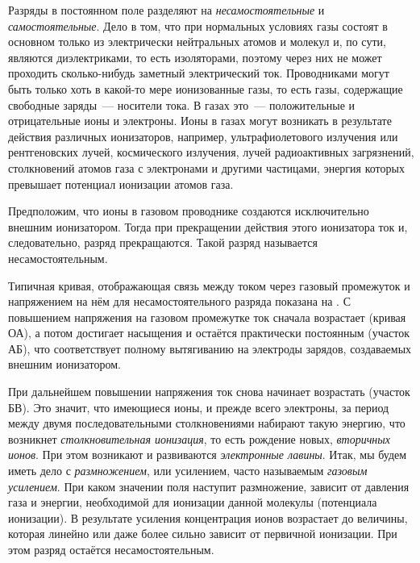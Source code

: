 Разряды в постоянном поле разделяют на \textit{несамостоятельные} и \textit{самостоятельные}. Дело в том, что при нормальных
условиях газы состоят в основном только из электрически нейтральных атомов и молекул и, по сути, являются диэлектриками,
то есть изоляторами, поэтому через них не может проходить сколько-нибудь заметный электрический ток. Проводниками могут
быть только хоть в какой-то мере ионизованные газы, то есть газы, содержащие свободные заряды~--- носители тока. В газах
это~--- положительные и отрицательные ионы и электроны. Ионы в газах могут возникать в результате действия различных
ионизаторов, например, ультрафиолетового излучения или рентгеновских лучей, космического излучения, лучей радиоактивных
загрязнений, столкновений атомов газа с электронами и другими частицами, энергия которых превышает потенциал ионизации
атомов газа.

Предположим, что ионы в газовом проводнике создаются исключительно внешним ионизатором. Тогда при прекращении действия
этого ионизатора ток и, следовательно, разряд прекращаются. Такой разряд называется несамостоятельным.

{
}


Типичная кривая, отображающая связь между током через газовый промежуток и напряжением на нём для несамостоятельного разряда показана на . С повышением напряжения
на газовом промежутке ток сначала возрастает (кривая ОА), а потом достигает насыщения и остаётся практически постоянным
(участок АБ), что соответствует полному вытягиванию на электроды зарядов, создаваемых внешним ионизатором.

При дальнейшем повышении напряжения ток снова начинает возрастать (участок БВ). Это значит, что имеющиеся ионы, и прежде
всего электроны, за период между двумя последовательными столкновениями набирают такую энергию, что возникнет
\textit{столкновительная ионизация}, то есть рождение новых, {\em вторичных ионов}. При этом возникают и развиваются
\textit{электронные лавины}. Итак, мы будем иметь дело с {\em размножением}, или усилением, часто называемым {\em газовым
усилением}. При каком значении поля наступит размножение, зависит от давления газа и энергии, необходимой для ионизации
данной молекулы (потенциала ионизации). В результате усиления концентрация ионов возрастает до величины, которая линейно
или даже более сильно зависит от первичной ионизации. При этом разряд остаётся несамостоятельным.

